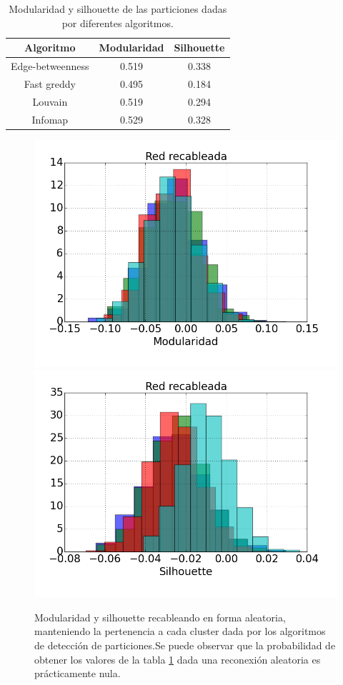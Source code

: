 \begin{table}
\centering
\caption{Modularidad y silhouette de las particiones dadas por diferentes algoritmos.}
\label{table:Modularidad}
\begin{tabular}{c c c}
\hline \hline
Algoritmo & Modularidad & Silhouette \\
\hline
Edge-betweenness & 0.519 & 0.338 \\
Fast greddy & 0.495 & 0.184 \\
Louvain & 0.519 & 0.294 \\
Infomap & 0.529 & 0.328 \\
\hline\hline
\end{tabular}
\end{table}

\begin{figure}
\centering
\includegraphics[scale = 0.5]{Modularidad_random}
\includegraphics[scale = 0.5]{Silhouette_random}
\caption{Modularidad y silhouette recableando en forma aleatoria, manteniendo la pertenencia a cada cluster dada por los algoritmos de detección de particiones.Se puede observar que la probabilidad de obtener los valores de la tabla \ref{table:Modularidad} dada una reconexión aleatoria es prácticamente nula.}
\label{fig:Modularidad_random}
\end{figure}
